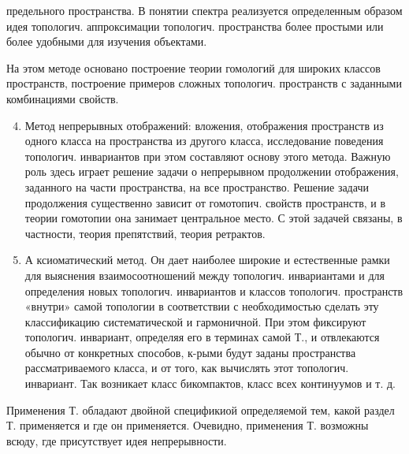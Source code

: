 \documentclass[10pt]{article}
\begin{document}
предельного пространства. В понятии спектра реализуется определенным образом идея топологич. аппроксимации топологич. пространства более простыми или более удобными для изучения объектами.



На этом методе основано построение теории гомологий для широких классов пространств, построение примеров сложных топологич. пространств с заданными комбинациями свойств.



\begin{enumerate}

  \setcounter{enumi}{3}

  \item Метод непрерывных отображений: вложения, отображения пространств из одного класса на пространства из другого класса, исследование поведения топологич. инвариантов при этом составляют основу этого метода. Важную роль здесь играет решение задачи о непрерывном продолжении отображения, заданного на части пространства, на все пространство. Решение задачи продолжения существенно зависит от гомотопич. свойств пространств, и в теории гомотопии она занимает центральное место. С этой задачей связаны, в частности, теория препятствий, теория ретрактов.



  \item А ксиоматический метод. Он дает наиболее широкие и естественные рамки для выяснения взаимосоотношений между топологич. инвариантами и для определения новых топологич. инвариантов и классов топологич. пространств «внутри» самой топологии в соответствии с необходимостью сделать эту классификацию систематической и гармоничной. При этом фиксируют топологич. инвариант, определяя его в терминах самой Т., и отвлекаются обычно от конкретных способов, к-рыми будут заданы пространства рассматриваемого класса, и от того, как вычислять этот топологич. инвариант. Так возникает класс бикомпактов, класс всех континуумов и т. д.



\end{enumerate}



Применения Т. обладают двойной спецификиой определяемой тем, какой раздел Т. применяется и где он применяется. Очевидно, применения Т. возможны всюду, где присутствует идея непрерывности.
\end{document}

